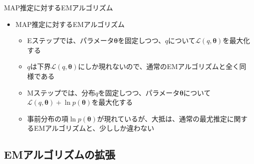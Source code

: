 \documentclass[dvipdfmx,notheorems,t]{beamer}
\begin{document}
\begin{frame}{MAP推定に対するEMアルゴリズム}
\begin{itemize}
	\framebreak
	
	\item MAP推定に対するEMアルゴリズム
	\begin{itemize}
		\item \alert{Eステップ}では、パラメータ$\bm{\theta}$を固定しつつ、$q$について$\mathcal{L}(q, \bm{\theta})$を最大化する
		\item $q$は下界$\mathcal{L}(q, \bm{\theta})$にしか現れないので、\alert{通常のEMアルゴリズムと全く同様}である
		\newline
		\item \alert{Mステップ}では、分布$q$を固定しつつ、パラメータ$\bm{\theta}$について$\mathcal{L}(q, \bm{\theta}) + \ln p(\bm{\theta})$を最大化する
		\item 事前分布の項$\ln p(\bm{\theta})$が現れているが、大抵は、通常の最尤推定に関するEMアルゴリズムと、少ししか違わない
	\end{itemize}
\end{itemize}

\end{frame}

\subsection{EMアルゴリズムの拡張}
\end{document}
